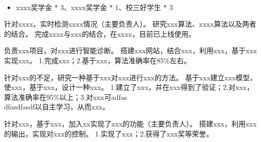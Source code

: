 \documentclass{resume}
\begin{document}
	
	\sepspace
	
	 \\
	
	
	\begin{itemize}
		\item xxxx奖学金 * 3、xxxx奖学金 * 1、校三好学生 * 3
	\end{itemize}
	
	\sepspace
	
	\Content
	{针对xxxx，实时检测xxxx情况（主要负责人）。}
	{研究xxx算法、xxxx算法以及两者的结合。}
	{完成xxxx与xxx的结合，在xxxx，目前已上线使用。}
	
	\Content
	{负责xxx项目，对xxx进行智能诊断。}
	{搭建xxx网站，结合xxx，利用xxx，基于xxx实现xxx。}
	{1.完成xxx；2.基于xxx，算法准确率在85\%左右。}
	
	\Content
	{针对xxx的不足，研究一种基于xxx对xxx进行xxx的方法。}
	{基于xxx建立xxx模型，使xxx，基于xxx，设计一种xxx。}
	{1.建立了xxx，并在xxx得到了验证；2.对xxx，算法准确率在95\%以上；3.对xxx可adfas \\dfasdfasdf以自主学习，从而xxx。}
	
	\Content
	{针对xxx，基于xxx，加入xx实现了xxx的功能（主要负责人）。}
	{搭建xxx，利用xxx的输出，实现对xxx的控制。}
	{1.实现了xxx；2.获得了xxx奖等荣誉。}
	
	
\end{document}

